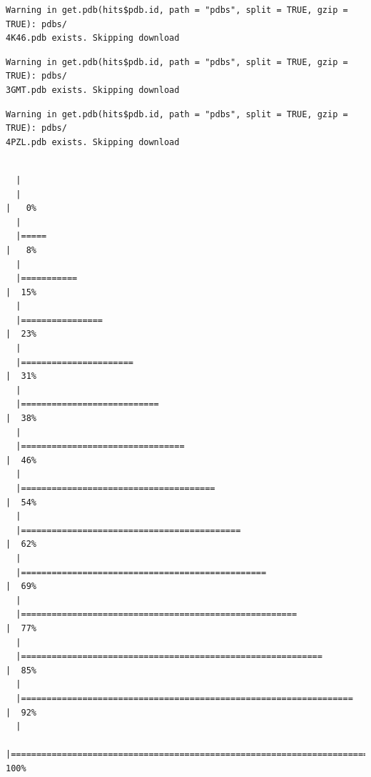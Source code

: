 \documentclass[
  letterpaper,
  DIV=11,
  numbers=noendperiod]{scrartcl}
\begin{document}
\begin{verbatim}
Warning in get.pdb(hits$pdb.id, path = "pdbs", split = TRUE, gzip = TRUE): pdbs/
4K46.pdb exists. Skipping download
\end{verbatim}

\begin{verbatim}
Warning in get.pdb(hits$pdb.id, path = "pdbs", split = TRUE, gzip = TRUE): pdbs/
3GMT.pdb exists. Skipping download
\end{verbatim}

\begin{verbatim}
Warning in get.pdb(hits$pdb.id, path = "pdbs", split = TRUE, gzip = TRUE): pdbs/
4PZL.pdb exists. Skipping download
\end{verbatim}

\begin{verbatim}

  |                                                                            
  |                                                                      |   0%
  |                                                                            
  |=====                                                                 |   8%
  |                                                                            
  |===========                                                           |  15%
  |                                                                            
  |================                                                      |  23%
  |                                                                            
  |======================                                                |  31%
  |                                                                            
  |===========================                                           |  38%
  |                                                                            
  |================================                                      |  46%
  |                                                                            
  |======================================                                |  54%
  |                                                                            
  |===========================================                           |  62%
  |                                                                            
  |================================================                      |  69%
  |                                                                            
  |======================================================                |  77%
  |                                                                            
  |===========================================================           |  85%
  |                                                                            
  |=================================================================     |  92%
  |                                                                            
  |======================================================================| 100%
\end{verbatim}
\end{document}
